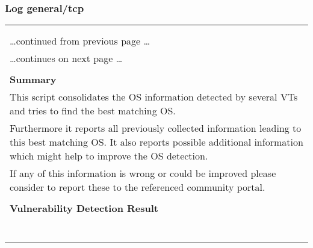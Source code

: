 \documentclass{article}
\begin{document}

\subsubsection{Log general/tcp}
\label{port:192.168.178.23 general/tcp Log}

\begin{longtable}{|p{}|}
\hline
\rowcolor{gvm_log}{\color{white}{Log (CVSS: 0.0) }}\\
\rowcolor{gvm_log}{\color{white}{NVT: OS Detection Consolidation and Reporting}}\\
\hline
\endfirsthead
\hfill\ldots continued from previous page \ldots \\
\hline
\endhead
\hline
\ldots continues on next page \ldots \\
\endfoot
\hline
\endlastfoot
\\
\textbf{Summary}\\
This script consolidates the OS information detected by several
  VTs and tries to find the best matching OS.\\
  Furthermore it reports all previously collected information leading to this best matching OS. It
  also reports possible additional information which might help to improve the OS detection.\\
  If any of this information is wrong or could be improved please consider to report these to the
  referenced community portal.\\

        \hline
        \\
\textbf{Vulnerability Detection Result}\\
\rowcolor{white}{\verb=Best matching OS:=}\\
\rowcolor{white}{\verb=OS:           Linux Kernel=}\\
\rowcolor{white}{\verb=CPE:          cpe:/o:linux:kernel=}\\
\rowcolor{white}{\verb=Found by NVT: 1.3.6.1.4.1.25623.1.0.102002 (Operating System (OS) Detection (ICM=}\\
\rowcolor{white}{$\hookrightarrow$\verb=P))=}\\
\rowcolor{white}{\verb=Concluded from ICMP based OS fingerprint=}\\
\rowcolor{white}{\verb=Setting key "Host/runs_unixoide" based on this information=}\\


\end{longtable}
\end{document}
